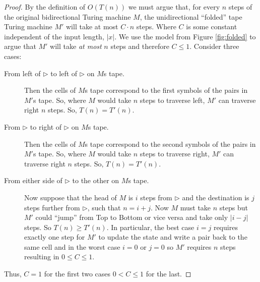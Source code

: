 \documentclass[usletter]{article}
\begin{document}
\begin{proof}
  By the definition of $O(T(n))$ we must argue that, for every $n$ steps of the original bidirectional Turing machine $M$, the unidirectional ``folded'' tape Turing machine $M'$ will take at most $C \cdot n$ steps. Where $C$ is some constant independent of the input length, $|x|$. We use the model from Figure \ref{fig:folded} to argue that $M'$ will take \textit{at most} $n$ steps and therefore $C \le 1$. Consider three cases:

  \begin{description}
    \item[From left of $\rhd$ to left of $\rhd$ on $M$s tape.] Then the cells of $M$s tape correspond to the first symbols of the pairs in $M'$s tape. So, where $M$ would take $n$ steps to traverse left, $M'$ can traverse right $n$ steps. So, $T(n) = T'(n)$.

    \item[From $\rhd$ to right of $\rhd$ on $M$s tape.] Then the cells of $M$s tape correspond to the second symbols of the pairs in $M'$s tape. So, where $M$ would take $n$ steps to traverse right, $M'$ can traverse right $n$ steps. So, $T(n) = T'(n)$.

    \item[From either side of $\rhd$ to the other on $M$s tape.] Now suppose that the head of $M$ is $i$ steps from $\rhd$ and the destination is $j$ steps further from $\rhd$, such that $n = i + j$. Now $M$ must take $n$ steps but $M'$ could ``jump'' from Top to Bottom or vice versa and take only $|i - j|$ steps. So $T(n) \ge T'(n)$. In particular, the best case $i = j$ requires exactly one step for $M'$ to update the state and write a pair back to the same cell and in the worst case $i = 0$  or $j = 0$ so $M'$ requires $n$ steps resulting in $0 \le C \le 1$.
  \end{description}

Thus, $C = 1$ for the first two cases $0 < C \le 1$ for the last.
\end{proof}


\newpage



\end{document}
